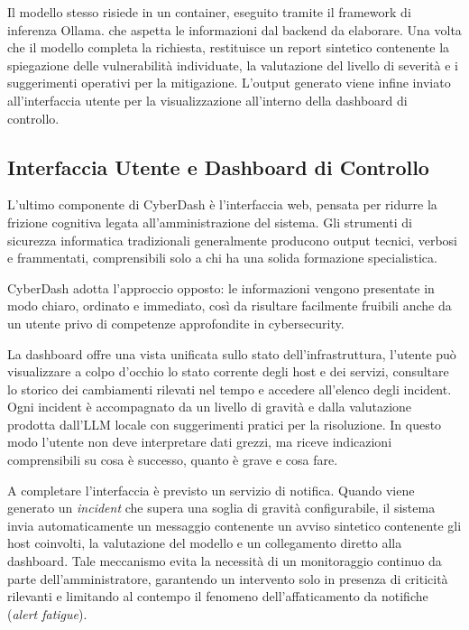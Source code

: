 \documentclass{article}
\begin{document}
Il modello stesso risiede in un container, eseguito tramite il framework di inferenza Ollama. che aspetta le informazioni dal backend da elaborare. Una volta che il modello completa la richiesta, restituisce un report sintetico contenente la spiegazione delle vulnerabilità individuate, la valutazione del livello di severità e i suggerimenti operativi per la mitigazione. L'output generato viene infine inviato all'interfaccia utente per la visualizzazione all'interno della dashboard di controllo.



\subsection{Interfaccia Utente e Dashboard di Controllo}
L'ultimo componente di CyberDash è l'interfaccia web, pensata per ridurre la frizione cognitiva legata all'amministrazione del sistema. Gli strumenti di sicurezza informatica tradizionali generalmente producono output tecnici, verbosi e frammentati, comprensibili solo a chi ha una solida formazione specialistica.

CyberDash adotta l'approccio opposto: le informazioni vengono presentate in modo chiaro, ordinato e immediato, così da risultare facilmente fruibili anche da un utente privo di competenze approfondite in cybersecurity.

La dashboard offre una vista unificata sullo stato dell'infrastruttura, l'utente può visualizzare a colpo d'occhio lo stato corrente degli host e dei servizi, consultare lo storico dei cambiamenti rilevati nel tempo e accedere all'elenco degli incident. Ogni incident è accompagnato da un livello di gravità e dalla valutazione prodotta dall'LLM locale con suggerimenti pratici per la risoluzione. In questo modo l'utente non deve interpretare dati grezzi, ma riceve indicazioni comprensibili su cosa è successo, quanto è grave e cosa fare.

A completare l'interfaccia è previsto un servizio di notifica. Quando viene generato un \textit{incident} che supera una soglia di gravità configurabile, il sistema invia automaticamente un messaggio contenente un avviso sintetico contenente gli host coinvolti, la valutazione del modello e un collegamento diretto alla dashboard. Tale meccanismo evita la necessità di un monitoraggio continuo da parte dell'amministratore, garantendo un intervento solo in presenza di criticità rilevanti e limitando al contempo il fenomeno dell'affaticamento da notifiche (\textit{alert fatigue}).
\end{document}
